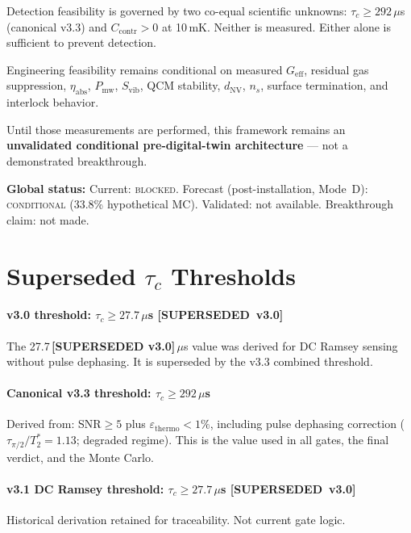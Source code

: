 \documentclass[12pt,a4paper]{article}
\newcommand{\blocked}{\textsc{blocked}}
\newcommand{\conditional}{\textsc{conditional}}
\newcommand{\superseded}{\textbf{[SUPERSEDED~v3.0]}}
\begin{document}
Detection feasibility is governed by two co-equal scientific unknowns:
$\tau_c \geq 292\,\mu$s (canonical v3.3) and $C_\mathrm{contr} > 0$ at 10\,mK.
Neither is measured.
Either alone is sufficient to prevent detection.

Engineering feasibility remains conditional on measured $G_\mathrm{eff}$,
residual gas suppression, $\eta_\mathrm{abs}$, $P_\mathrm{mw}$, $S_\mathrm{vib}$,
QCM stability, $d_\mathrm{NV}$, $n_s$, surface termination, and interlock behavior.

Until those measurements are performed, this framework remains an \textbf{unvalidated
conditional pre-digital-twin architecture} --- not a demonstrated breakthrough.

\textbf{Global status:}
Current: \blocked{}.
Forecast (post-installation, Mode~D): \conditional{} (33.8\% hypothetical MC).
Validated: not available.
Breakthrough claim: not made.

\appendix

\section{Superseded $\tau_c$ Thresholds}
\label{app:tau_superseded}

\paragraph{v3.0 threshold: $\tau_c \geq 27.7\,\mu$s \superseded{}}
The 27.7\,\textbf{[SUPERSEDED v3.0]}\,$\mu$s value was derived for DC Ramsey sensing without pulse dephasing.
It is superseded by the v3.3 combined threshold.

\paragraph{Canonical v3.3 threshold: $\tau_c \geq 292\,\mu$s}
Derived from: SNR$\geq5$ plus $\varepsilon_\mathrm{thermo}<1\%$,
including pulse dephasing correction ($\tau_{\pi/2}/T_2^* = 1.13$; degraded regime).
This is the value used in all gates, the final verdict, and the Monte Carlo.

\paragraph{v3.1 DC Ramsey threshold: $\tau_c \geq 27.7\,\mu$s \superseded{}}
Historical derivation retained for traceability.
Not current gate logic.
\end{document}
